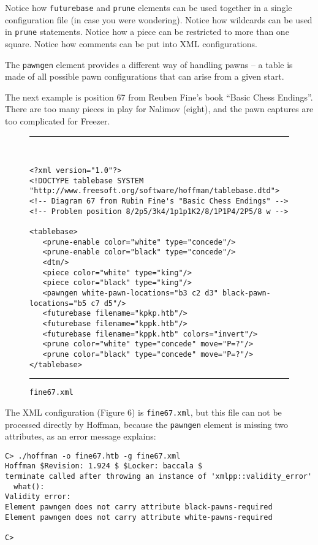 \documentclass[11pt]{article}
\begin{document}
Notice how {\tt futurebase} and {\tt prune} elements can be used
together in a single configuration file (in case you were wondering).
Notice how wildcards can be used in {\tt prune} statements.  Notice
how a piece can be restricted to more than one square.  Notice how
comments can be put into XML configurations.

The {\tt pawngen} element provides a different way of handling pawns
-- a table is made of all possible pawn configurations that can
arise from a given start.

The next example is position 67 from Reuben Fine's book ``Basic Chess
Endings''.  There are too many pieces in play for Nalimov (eight), and
the pawn captures are too complicated for Freezer.

\showboard

\begin{figure}
\hrule\ 
{\small\begin{verbatim}
<?xml version="1.0"?>
<!DOCTYPE tablebase SYSTEM "http://www.freesoft.org/software/hoffman/tablebase.dtd">
<!-- Diagram 67 from Rubin Fine's "Basic Chess Endings" -->
<!-- Problem position 8/2p5/3k4/1p1p1K2/8/1P1P4/2P5/8 w -->

<tablebase>
   <prune-enable color="white" type="concede"/>
   <prune-enable color="black" type="concede"/>
   <dtm/>
   <piece color="white" type="king"/>
   <piece color="black" type="king"/>
   <pawngen white-pawn-locations="b3 c2 d3" black-pawn-locations="b5 c7 d5"/>
   <futurebase filename="kpkp.htb"/>
   <futurebase filename="kppk.htb"/>
   <futurebase filename="kppk.htb" colors="invert"/>
   <prune color="white" type="concede" move="P=?"/>
   <prune color="black" type="concede" move="P=?"/>
</tablebase>
\end{verbatim}}
\hrule
\caption{\tt fine67.xml}
\end{figure}

The XML configuration (Figure 6) is {\tt fine67.xml}, but this file
can not be processed directly by Hoffman, because the {\tt pawngen}
element is missing two attributes, as an error message explains:

\begin{verbatim}
C> ./hoffman -o fine67.htb -g fine67.xml
Hoffman $Revision: 1.924 $ $Locker: baccala $
terminate called after throwing an instance of 'xmlpp::validity_error'
  what():  
Validity error:
Element pawngen does not carry attribute black-pawns-required
Element pawngen does not carry attribute white-pawns-required

C>
\end{verbatim}
\end{document}
